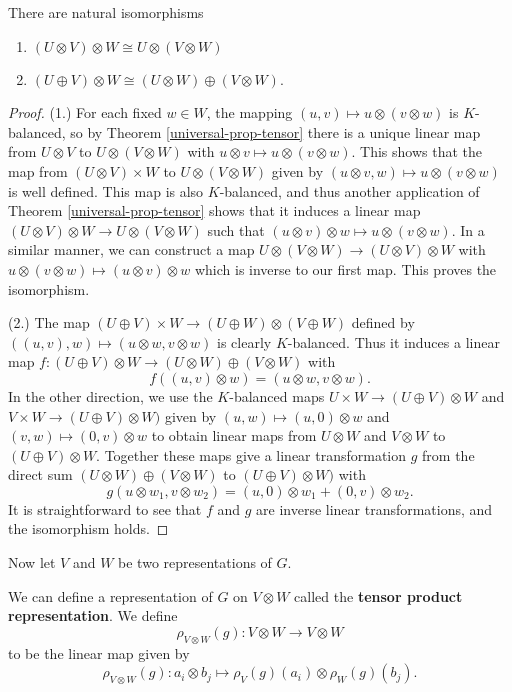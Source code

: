 \begin{prop}
There are natural isomorphisms 
\begin{enumerate}
\item $(U \otimes V) \otimes W \cong U \otimes (V \otimes W)$ 
\item $( U \oplus V) \otimes W \cong (U \otimes W) \oplus (V \otimes W)$.
\end{enumerate}
\end{prop}
\begin{proof}
(1.) For each fixed $w \in W$, the mapping $(u,v) \mapsto u \otimes ( v \otimes w)$ is $K$-balanced, so by Theorem \ref{universal-prop-tensor} there is a unique linear map from $U \otimes V$ to $U \otimes ( V \otimes W)$ with $u \otimes v \mapsto u \otimes (v \otimes w)$.  This shows that the map from $(U \otimes V ) \times W$ to $U \otimes ( V \otimes W)$ given by $(u \otimes v, w ) \mapsto u \otimes (v \otimes w)$ is well defined.  This map is also $K$-balanced, and  thus another application of Theorem \ref{universal-prop-tensor} shows that it induces a linear map $(U \otimes V) \otimes W \to U \otimes ( V \otimes W)$ such that $(u \otimes v) \otimes w \mapsto u \otimes (v \otimes w)$.  In a similar manner, we can construct a map $U \otimes (V \otimes W) \to (U \otimes V) \otimes W$ with $u \otimes ( v \otimes w) \mapsto (u \otimes v) \otimes w$ which is inverse to our first map.  This proves the isomorphism.

(2.)  The map $(U \oplus V ) \times W \to (U \oplus W) \otimes (V \oplus W)$ defined by $((u, v ) , w) \mapsto (u \otimes w, v \otimes w)$ is clearly $K$-balanced.  Thus it induces a linear map $f \colon (U \oplus V) \otimes W \to (U \otimes W) \oplus (V \otimes W)$ with 
\[ f ( ( u, v ) \otimes w) = (u \otimes w, v \otimes w). \]
In the other direction, we use the $K$-balanced maps $U \times W \to (U \oplus V) \otimes W$ and $V \times W \to (U \oplus V) \otimes W)$ given by $(u, w) \mapsto (u, 0)\otimes w$ and $(v,w) \mapsto (0,v) \otimes w$ to obtain linear maps from $U \otimes W$ and $V \otimes W$ to $(U \oplus V) \otimes W$.  Together these maps give a linear transformation $g$ from the direct sum $(U \otimes W) \oplus ( V \otimes W)$ to $(U \oplus V) \otimes W)$ with 
\[ g ( u \otimes w_1, v \otimes w_2) = (u, 0) \otimes w_1 + (0,v) \otimes w_2. \]
It is straightforward to see that $f$ and $g$ are inverse linear transformations, and the isomorphism holds.
\end{proof}


Now let $V$ and $W$ be two representations of $G$.
\begin{defn}
We can define a representation of $G$ on $V \otimes W$ called the \textbf{tensor product representation}. We define
\[ \rho_{V \otimes W} (g) \colon V \otimes W \to V \otimes W \]
to be the linear map given by
\[ \rho_{V \otimes W} (g) \colon a_i \otimes b_j \mapsto \rho_V (g) (a_i) \otimes \rho_W (g) (b_j).\]
\end{defn}


